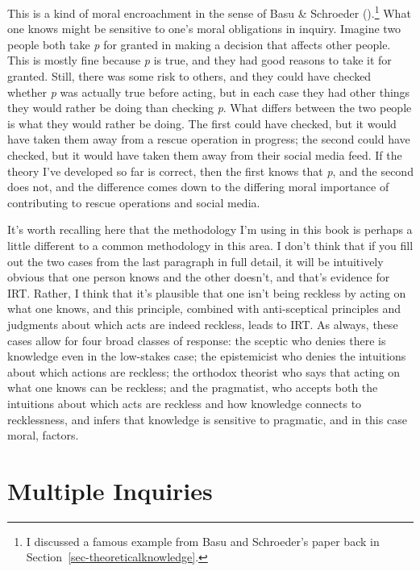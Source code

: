 \documentclass[
  12pt,
  letterpaper,
]{scrbook}
\begin{document}
This is a kind of moral encroachment in the sense of Basu \& Schroeder
().\footnote{I discussed a famous
  example from Basu and Schroeder's paper back in
  Section~\ref{sec-theoreticalknowledge}.} What one knows might be
sensitive to one's moral obligations in inquiry. Imagine two people both
take \emph{p} for granted in making a decision that affects other
people. This is mostly fine because \emph{p} is true, and they had good
reasons to take it for granted. Still, there was some risk to others,
and they could have checked whether \emph{p} was actually true before
acting, but in each case they had other things they would rather be
doing than checking \emph{p}. What differs between the two people is
what they would rather be doing. The first could have checked, but it
would have taken them away from a rescue operation in progress; the
second could have checked, but it would have taken them away from their
social media feed. If the theory I've developed so far is correct, then
the first knows that \emph{p}, and the second does not, and the
difference comes down to the differing moral importance of contributing
to rescue operations and social media.

It's worth recalling here that the methodology I'm using in this book is
perhaps a little different to a common methodology in this area. I don't
think that if you fill out the two cases from the last paragraph in full
detail, it will be intuitively obvious that one person knows and the
other doesn't, and that's evidence for IRT. Rather, I think that it's
plausible that one isn't being reckless by acting on what one knows, and
this principle, combined with anti-sceptical principles and judgments
about which acts are indeed reckless, leads to IRT. As always, these
cases allow for four broad classes of response: the sceptic who denies
there is knowledge even in the low-stakes case; the epistemicist who
denies the intuitions about which actions are reckless; the orthodox
theorist who says that acting on what one knows can be reckless; and the
pragmatist, who accepts both the intuitions about which acts are
reckless and how knowledge connects to recklessness, and infers that
knowledge is sensitive to pragmatic, and in this case moral, factors.

\section{Multiple Inquiries}\label{sec-multiple}
\end{document}

